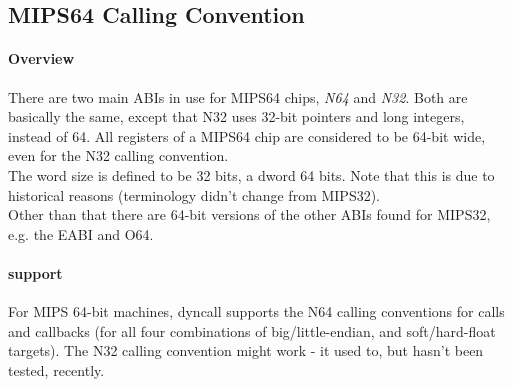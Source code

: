 %
%
%
%

\subsection{MIPS64 Calling Convention}

\paragraph{Overview}

There are two main ABIs in use for MIPS64 chips, \emph{N64}\cite{MIPSn32/n64} and \emph{N32}\cite{MIPSn32/n64}. Both are
basically the same, except that N32 uses 32-bit pointers and long integers, instead of 64. All registers of a MIPS64 chip are considered
to be 64-bit wide, even for the N32 calling convention.\\
The word size is defined to be 32 bits, a dword 64 bits. Note that this is due to historical reasons (terminology didn't change from MIPS32).\\
Other than that there are 64-bit versions of the other ABIs found for MIPS32, e.g. the EABI\cite{MIPSeabi} and O64\cite{MIPSo64}.

\paragraph{ support}

For MIPS 64-bit machines, dyncall supports the N64 calling conventions for calls and callbacks (for all four combinations of big/little-endian, and soft/hard-float targets).
The N32 calling convention might work - it used to, but hasn't been tested, recently.

